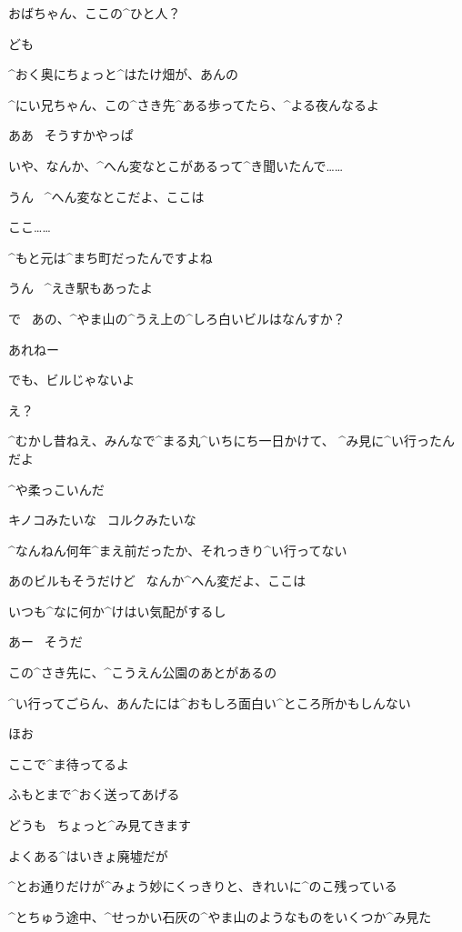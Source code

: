 \Ayase おばちゃん、ここの^{ひと}{人}？

\Ayase ども

\Person ^{おく}{奥}にちょっと^{はたけ}{畑}が、あんの

\Person ^{にい}{兄}ちゃん、この^{さき}{先}^{ある}{歩}ってたら、^{よる}{夜}んなるよ

\Ayase ああ
\ そうすかやっぱ

\Ayase いや、なんか、^{へん}{変}なとこがあるって^{き}{聞}いたんで……

\Person うん
\ ^{へん}{変}なとこだよ、ここは

\Ayase ここ……

\Ayase ^{もと}{元}は^{まち}{町}だったんですよね

\Person うん
\ ^{えき}{駅}もあったよ

\page[92]
\Ayase で
\ あの、^{やま}{山}の^{うえ}{上}の^{しろ}{白}いビルはなんすか？

\Person あれねー

\Person でも、ビルじゃないよ

\Ayase え？

\Person ^{むかし}{昔}ねえ、みんなで^{まる}{丸}^{いちにち}{一日}かけて、
^{み}{見}に^{い}{行}ったんだよ

\Person ^{や}{柔}っこいんだ

\Person キノコみたいな
\ コルクみたいな

\Person ^{なんねん}{何年}^{まえ}{前}だったか、それっきり^{い}{行}ってない

\page[93]
\Person あのビルもそうだけど
\ なんか^{へん}{変}だよ、ここは

\Person いつも^{なに}{何}か^{けはい}{気配}がするし

\Person あー
\ そうだ

\Person この^{さき}{先}に、^{こうえん}{公園}のあとがあるの

\Person ^{い}{行}ってごらん、あんたには^{おもしろ}{面白}い^{ところ}{所}かもしんない

\Ayase ほお

\Person ここで^{ま}{待}ってるよ

\Person ふもとまで^{おく}{送}ってあげる

\Ayase どうも
\ ちょっと^{み}{見}てきます

\page[94]
\Ayase よくある^{はいきょ}{廃墟}だが

\Ayase ^{とお}{通}りだけが^{みょう}{妙}にくっきりと、きれいに^{のこ}{残}っている

\Ayase ^{とちゅう}{途中}、^{せっかい}{石灰}の^{やま}{山}のようなものをいくつか^{み}{見}た

